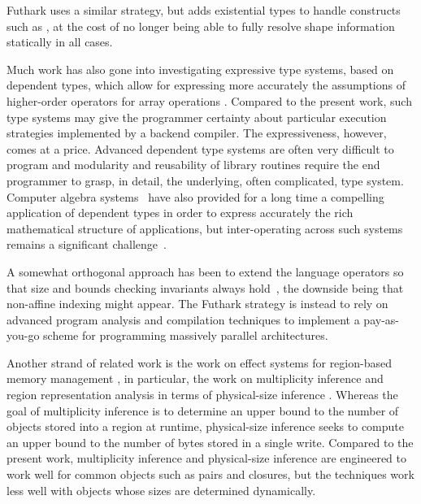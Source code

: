 Futhark uses a similar strategy, but adds existential types to handle
constructs such as , at the cost of no longer being able to
fully resolve shape information statically in all cases.

Much work has also gone into investigating expressive type systems,
based on dependent types, which allow for expressing more accurately
the assumptions of higher-order operators for array operations
\cite{AgdaAccellerate,Trojahner:2008,Trojahner2009643}. Compared to
the present work, such type systems may give the programmer certainty
about particular execution strategies implemented by a backend
compiler. The expressiveness, however, comes at a price. Advanced
dependent type systems are often very difficult to program and
modularity and reusability of library routines require the end
programmer to grasp, in detail, the underlying, often complicated,
type system.  Computer algebra systems~\cite{AXIOM,AldorCAH} have also
provided for a long time a compelling application of dependent types
in order to express accurately the rich mathematical structure of
applications, but inter-operating across such systems remains a
significant challenge~\cite{mapal_synasc,alma:ISSAC}.

A somewhat orthogonal approach has been to extend the language
operators so that size and bounds checking invariants always
hold~\cite{ElsmanDybdal:Array:2014}, the downside being that
non-affine indexing might appear.  The Futhark strategy is instead to
rely on advanced program analysis and compilation techniques to
implement a pay-as-you-go scheme for programming massively parallel
architectures.

Another strand of related work is the work on effect systems for
region-based memory management \cite{mlkit_retrospective}, in
particular, the work on multiplicity inference and region
representation analysis in terms of physical-size inference
\cite{vejlstrup94,btv96}. Whereas the goal of multiplicity inference
is to determine an upper bound to the number of objects stored into a
region at runtime, physical-size inference seeks to compute an upper
bound to the number of bytes stored in a single write. Compared to the
present work, multiplicity inference and physical-size inference are
engineered to work well for common objects such as pairs and closures,
but the techniques work less well with objects whose sizes are
determined dynamically.

